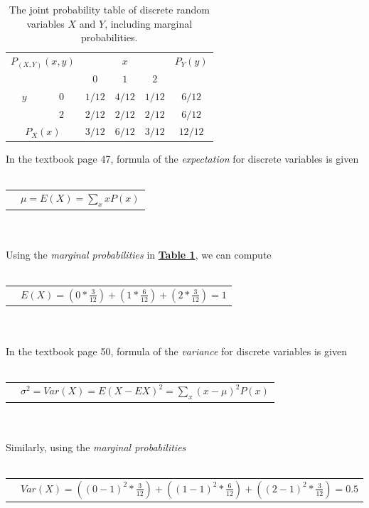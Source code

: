 \documentclass[12pt]{article}
\begin{document}
\begin{table}[h]
    \centering
    \begin{tabular}{ |c|c|c|c|c|c|}
        \hline
        \multicolumn{2}{|c|}{\multirow{2}{*}{$P_{(X,Y)}(x,y)$}} & \multicolumn{3}{c|}{$x$} & \multirow{2}{*}{$P_{Y}(y)$} \\
        \cline{3-5}
        \multicolumn{2}{|c|}{} & $0$ & $1$ & $2$ & \\
        \hline
        \multirow{2}{*}{$y$} & $0$ & $1/12$ & $4/12$ & $1/12$ & $6/12$\\
        \cline{3-6}
        & $2$ & $2/12$ & $2/12$ & $2/12$ & $6/12$\\
        \hline
        \multicolumn{2}{|c|}{$P_{X}(x)$}& $3/12$ & $6/12$ & $3/12$ & $12/12$  \\
        \hline
    \end{tabular}
    \hypertarget{table1}{\caption{The joint probability table of discrete random variables $X$ and $Y$, including marginal probabilities.}}
\end{table}
In the textbook page 47, formula of the \hypertarget{expect}{\textit{expectation}} for discrete variables is given
\\ \\
\begin{tabular}{l l}
    &$\mu = E(X) = \sum\limits_x xP(x) $ 
\end{tabular}
\\ \\
Using the \textit{marginal probabilities} in \hyperlink{table1}{\textbf{Table 1}}, 
we can compute
\\ \\
\begin{tabular}{l l}
    &$E(X) = (0*\frac{3}{12})+(1*\frac{6}{12})+(2*\frac{3}{12})= 1$ 
\end{tabular}
\\ \\
In the textbook page 50, formula of the \hypertarget{var}{\textit{variance}} for discrete variables is given
\\ \\
\begin{tabular}{l l}
    &$\sigma^2 = Var(X) = E(X-EX)^2 = \sum\limits_x (x-\mu)^2P(x) $ 
\end{tabular}
\\ \\
Similarly, using the \textit{marginal probabilities}
\\ \\
\begin{tabular}{l l}
    &$Var(X) = ((0-1)^2*\frac{3}{12})+((1-1)^2*\frac{6}{12})+((2-1)^2*\frac{3}{12})=0.5$ 
\end{tabular}
\\ \\
\end{document}
